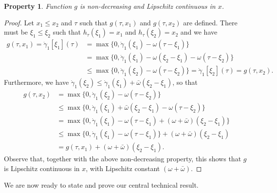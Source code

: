 \documentclass[a4paper]{article}
\theoremstyle{definition}
\theoremstyle{plain}
\newtheorem{property}{Property\hspace{0.25em}\ignorespaces}
\begin{document}
\begin{property}
  Function $g$ is non-decreasing and Lipschitz continuous in $x$.
\end{property}
\begin{proof}
  Let $x_{1} \leq x_{2}$ and $\tau$ such that $g(\tau, x_{1})$ and
  $g(\tau, x_{2})$ are defined. There must be $\xi_{1} \leq \xi_{2}$ such that
  $h_{\tau}(\xi_{1}) = x_{1}$ and $h_{\tau}(\xi_{2}) = x_{2}$ and we have
  \begin{align*}
    g(\tau, x_{1}) = \dot{\gamma}_{1}[\xi_{1}](\tau)
    &= \max\{0, \dot{\gamma}_{1}(\xi_{1}) - \omega(\tau - \xi_{1}) \} \\
    &= \max\{0, \dot{\gamma}_{1}(\xi_{1}) - \omega(\xi_{2} - \xi_{1}) - \omega(\tau - \xi_{2}) \} \\
    &\leq \max\{0, \dot{\gamma}_{1}(\xi_{2}) - \omega(\tau - \xi_{2}) \}
    = \dot{\gamma}_{1}[\xi_{2}](\tau) = g(\tau, x_{2}) .
  \end{align*}
  Furthermore, we have
  $\dot{\gamma}_{1}(\xi_{2}) \leq \dot{\gamma}_{1}(\xi_{1}) + \bar{\omega}(\xi_{2} - \xi_{1})$,
  so that
  \begin{align*}
    g(\tau, x_{2}) &= \max\{0, \dot{\gamma}_{1}(\xi_{2}) - \omega(\tau - \xi_{2}) \} \\
              &\leq \max\{0, \dot{\gamma}_{1}(\xi_{1}) + \bar{\omega}(\xi_{2} - \xi_{1}) - \omega(\tau - \xi_{2}) \} \\
              &= \max\{0, \dot{\gamma}_{1}(\xi_{1}) - \omega(\tau-\xi_{1}) + (\omega + \bar{\omega})(\xi_{2} - \xi_{1}) \} \\
              &\leq \max\{0, \dot{\gamma}_{1}(\xi_{1}) - \omega(\tau - \xi_{1}) \} + (\omega + \bar{\omega})(\xi_{2} - \xi_{1}) \\
              &= g(\tau, x_{1}) + (\omega + \bar{\omega})(\xi_{2} - \xi_{1}) .
  \end{align*}
  Observe that, together with the above non-decreasing property, this shows that
  $g$ is Lipschitz continuous in $x$, with Lipschitz constant
  $(\omega + \bar{\omega})$.
\end{proof}

We are now ready to state and prove our central technical result.
\end{document}
